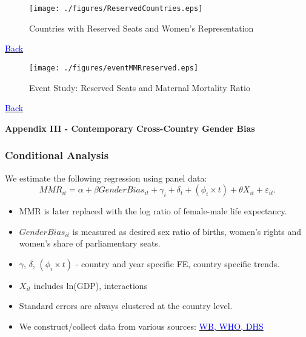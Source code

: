 \documentclass[9pt,letterpaper,subeqn]{beamer}
\begin{document}
\begin{frame}[label=quotaCover]
  \begin{figure}
    \caption{Countries with Reserved Seats and Women's Representation}
    \texttt{[image: ./figures/ReservedCountries.eps]}
  \end{figure}
  \hyperlink{Quotas}{{\footnotesize \textcolor{blue}{Back}}}
\end{frame}

\begin{frame}[label=quotalnMMR]
  \begin{figure}
    \caption{Event Study: Reserved Seats and Maternal Mortality Ratio}
    \texttt{[image: ./figures/eventMMRreserved.eps]}
  \end{figure}
  \hyperlink{quotaMMR}{{\footnotesize \textcolor{blue}{Back}}}
\end{frame}



\begin{frame}[plain]
\begin{center}
\textbf{Appendix III - Contemporary Cross-Country Gender Bias}
\end{center}
\end{frame}

\begin{frame}[label=CC]
\frametitle{Conditional Analysis}
We estimate the following regression using panel data:
	\begin{equation}
		MMR_{it} = \alpha + \beta GenderBias_{it} + \gamma_i + \delta_t + 
               (\phi_i\times t) + \theta X_{it} + \varepsilon_{it}. \nonumber
	\end{equation}
\vspace{4mm}
    \begin{itemize}
\setlength{\itemsep}{8pt}
	\item MMR is later replaced with the log ratio of female-male life expectancy.
  \item $GenderBias_{it}$ is measured as desired sex ratio of births, women's 
        rights and women's share of parliamentary seats.
	\item $\gamma$, $\delta$, $(\phi_i\times t)$ - country and year specific FE,
        country specific trends.  
  \item $X_{it}$ includes ln(GDP), interactions
	\item Standard errors are always clustered at the country level.
  \item We construct/collect data from various
        sources: \hyperlink{sumstatsWorld}{\textcolor{blue}{WB, WHO, DHS}}
\end{itemize}
\end{frame}
\end{document}
